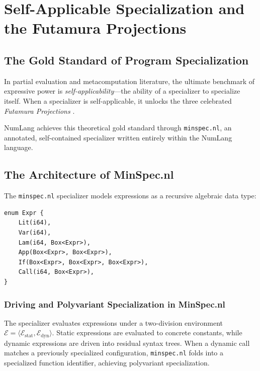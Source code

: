 \chapter{Self-Applicable Specialization and the Futamura Projections}
\label{chap:futamura}

\section{The Gold Standard of Program Specialization}
\label{sec:futamura:intro}

In partial evaluation and metacomputation literature, the ultimate benchmark of expressive power is \emph{self-applicability}---the ability of a specializer to specialize itself. When a specializer is self-applicable, it unlocks the three celebrated \emph{Futamura Projections} \citep{futamura1971partial}.

NumLang achieves this theoretical gold standard through \texttt{minspec.nl}, an annotated, self-contained specializer written entirely within the NumLang language.

\section{The Architecture of MinSpec.nl}
\label{sec:futamura:minspec}

The \texttt{minspec.nl} specializer models expressions as a recursive algebraic data type:

\begin{lstlisting}[language=NumLang, caption={AST representation inside MinSpec.nl.}]
enum Expr {
    Lit(i64),
    Var(i64),
    Lam(i64, Box<Expr>),
    App(Box<Expr>, Box<Expr>),
    If(Box<Expr>, Box<Expr>, Box<Expr>),
    Call(i64, Box<Expr>),
}
\end{lstlisting}

\subsection{Driving and Polyvariant Specialization in MinSpec.nl}
The specializer evaluates expressions under a two-division environment $\mathcal{E} = \langle \mathcal{E}_{\text{stat}}, \mathcal{E}_{\text{dyn}} \rangle$. Static expressions are evaluated to concrete constants, while dynamic expressions are driven into residual syntax trees. When a dynamic call matches a previously specialized configuration, \texttt{minspec.nl} folds into a specialized function identifier, achieving polyvariant specialization.

